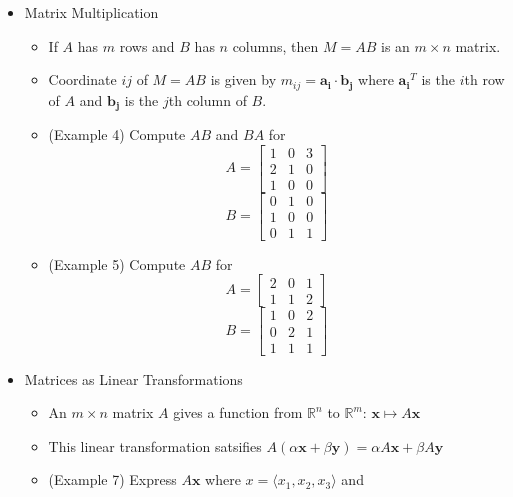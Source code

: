 \documentclass[11pt]{article}
\theoremstyle{plain}
\theoremstyle{definition}
\theoremstyle{remark}
\newcommand{\vect}[1]{\mathbf{#1}}
\newcommand{\<}{\langle}
\renewcommand{\>}{\rangle}
\newcommand{\mb}{\mathbb}
\begin{document}
\begin{itemize}
  \item Matrix Multiplication
    \begin{itemize}
      \item
        If \(A\) has \(m\) rows and \(B\) has \(n\) columns,
        then \(M=AB\) is an \(m\times n\) matrix.
      \item
        Coordinate \(ij\) of \(M=AB\) is given by
        \(m_{ij}=\vect{a_i}\cdot\vect{b_j}\)
        where \(\vect{a_i}^T\) is the \(i\)th row of \(A\)
        and \(\vect{b_j}\) is the \(j\)th column of \(B\).
      \item
        (Example 4) Compute \(AB\) and \(BA\) for
        \[
          A =
          \begin{bmatrix}
            1 & 0 & 3 \\
            2 & 1 & 0 \\
            1 & 0 & 0
          \end{bmatrix}
        \]
        \[
          B =
          \begin{bmatrix}
            0 & 1 & 0 \\
            1 & 0 & 0 \\
            0 & 1 & 1
          \end{bmatrix}
        \]
      \item
        (Example 5) Compute \(AB\) for
        \[
          A =
          \begin{bmatrix}
            2 & 0 & 1 \\
            1 & 1 & 2
          \end{bmatrix}
        \]
        \[
          B =
          \begin{bmatrix}
            1 & 0 & 2 \\
            0 & 2 & 1 \\
            1 & 1 & 1
          \end{bmatrix}
        \]
    \end{itemize}
  \item Matrices as Linear Transformations
    \begin{itemize}
      \item An \(m\times n\) matrix \(A\) gives a function from \(\mb R^n\)
            to \(\mb R^m\): \(\vect x \mapsto A\vect x\)
      \item This linear transformation satsifies
            \(
              A(\alpha\vect x + \beta\vect y)
                =
              \alpha A\vect x + \beta A\vect y
            \)
      \item (Example 7) Express \(A\vect x\) where \(x=\<x_1,x_2,x_3\>\) and

\end{itemize}
\end{itemize}
\end{document}
